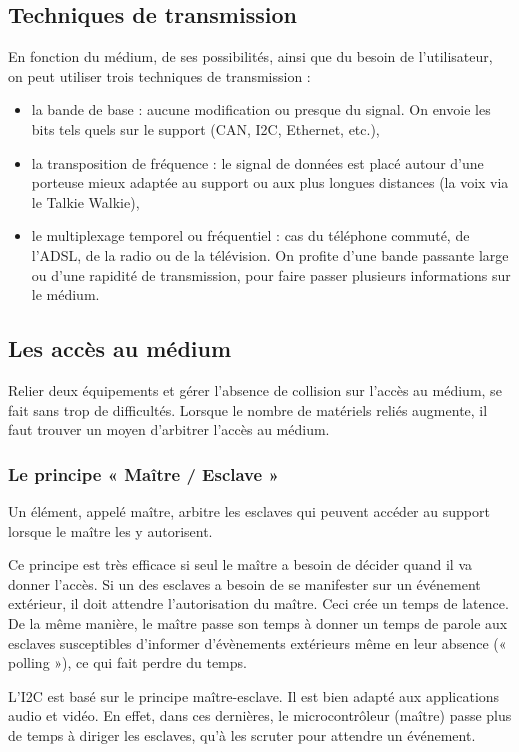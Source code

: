 \documentclass[10pt]{article}
\begin{document}
\subsection{Techniques de transmission}
En fonction du médium, de ses possibilités, ainsi que du besoin de l’utilisateur, on peut utiliser trois techniques de transmission :
\begin{itemize}
\item la bande de base : aucune modification ou presque du signal. On envoie les bits tels quels sur le support (CAN, I2C, Ethernet, etc.),
\item la transposition de fréquence : le signal de données est placé autour d’une porteuse mieux adaptée au support ou aux plus longues distances (la voix via le Talkie Walkie),
\item le multiplexage temporel ou fréquentiel : cas du téléphone commuté, de l’ADSL, de la radio ou de la télévision. On profite d’une bande passante large ou d’une rapidité de transmission, pour faire passer plusieurs informations sur le médium.
\end{itemize}


\subsection{Les accès au médium}
Relier deux équipements et gérer l’absence de collision sur l’accès au médium, se fait sans trop de difficultés. Lorsque le nombre de matériels reliés augmente, il faut trouver un moyen d’arbitrer l’accès au médium.

\subsubsection*{Le principe « Maître / Esclave »}
Un élément, appelé maître, arbitre les esclaves qui peuvent accéder au support lorsque le maître les y autorisent. 

Ce principe est très efficace si seul le maître a besoin de décider quand il va donner l’accès. Si un des esclaves a besoin de se manifester sur un événement extérieur, il doit attendre l’autorisation du maître. Ceci crée un temps de latence. De la même manière, le maître passe son temps à donner un temps de parole aux esclaves susceptibles d’informer d’évènements extérieurs même en leur absence (« polling »), ce qui fait perdre du temps.

L’I2C est basé sur le principe maître-esclave. Il est bien adapté aux applications audio et vidéo. En effet, dans ces dernières, le microcontrôleur (maître) passe plus de temps à diriger les esclaves, qu’à les scruter pour attendre un événement.
\end{document}

